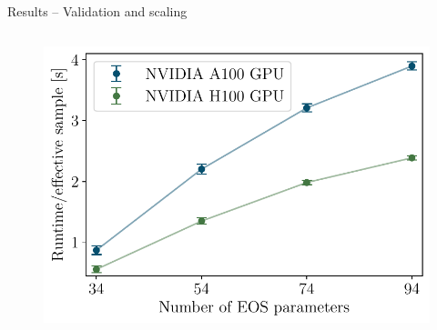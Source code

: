 \documentclass[usenames,dvipsnames,t]{beamer}
\begin{document}
\begin{frame}{Results -- Validation and scaling}
\begin{columns}
    \begin{figure}[htpb]
      \centering
      \includegraphics[width=0.975\linewidth]{Figures/scaling_plot.pdf}
    \end{figure}

  \end{columns}

\end{frame}
\end{document}

